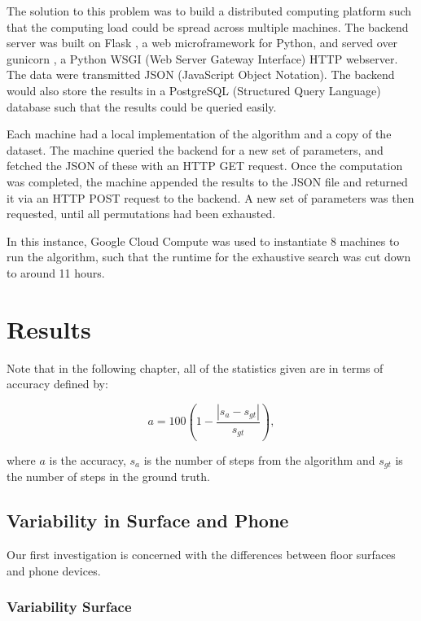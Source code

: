         The solution to this problem was to build a distributed computing platform such that the computing load could be spread across multiple machines. The backend server was built on Flask \cite{flask}, a web microframework for Python, and served over gunicorn \cite{gunicorn}, a Python WSGI (Web Server Gateway Interface) HTTP webserver. The data were transmitted JSON (JavaScript Object Notation). The backend would also store the results in a PostgreSQL (Structured Query Language) database \cite{postgres} such that the results could be queried easily.

        Each machine had a local implementation of the algorithm and a copy of the dataset. The machine queried the backend for a new set of parameters, and fetched the JSON of these with an HTTP GET request. Once the computation was completed, the machine appended the results to the JSON file and returned it via an HTTP POST request to the backend. A new set of parameters was then requested, until all permutations had been exhausted.

        In this instance, Google Cloud Compute \cite{gcc} was used to instantiate 8 machines to run the algorithm, such that the runtime for the exhaustive search was cut down to around 11 hours.

    \chapter{Results}

        Note that in the following chapter, all of the statistics given are in terms of accuracy defined by:

        \begin{equation}
            a = 100(1 - \frac{|s_{a}-s_{gt}|}{s_{gt}}),
        \end{equation}

        where $a$ is the accuracy, $s_{a}$ is the number of steps from the algorithm and $s_{gt}$ is the number of steps in the ground truth.

        \section{Variability in Surface and Phone}

            Our first investigation is concerned with the differences between floor surfaces and phone devices. 

            \subsection{Variability Surface}

